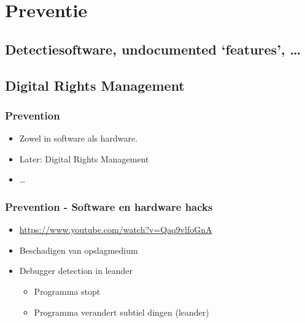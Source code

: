 \documentclass{beamer}
\begin{document}

\section{Preventie}
\subsection{Detectiesoftware, undocumented `features', \dots}
\subsection{Digital Rights Management}

\begin{frame}
	\frametitle{Prevention}


	\begin{itemize}
		\item Zowel in software als hardware.
		\item Later: Digital Rights Management
		\item \dots
	\end{itemize}
\end{frame}

\begin{frame}
	\frametitle{Prevention - Software en hardware hacks}

	\begin{itemize}
		\item \url{https://www.youtube.com/watch?v=Qaq9vlfoGnA}
		\item Beschadigen van opslagmedium
		\item Debugger detection in leander
		\begin{itemize}
			\item Programma stopt
			\item Programma verandert subtiel dingen (leander)
		\end{itemize}
	\end{itemize}
\end{frame}
\end{document}
